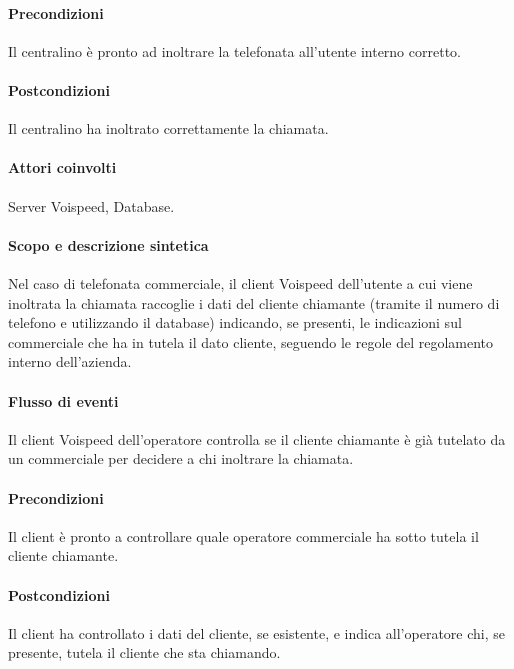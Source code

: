\paragraph{Precondizioni} Il centralino \` e pronto ad inoltrare la telefonata all'utente interno corretto.
\paragraph{Postcondizioni} Il centralino ha inoltrato correttamente la chiamata.

\paragraph{Attori coinvolti} Server Voispeed, Database.
\paragraph{Scopo e descrizione sintetica}
Nel caso di telefonata commerciale, il client Voispeed dell'utente a cui viene inoltrata la chiamata raccoglie i dati del cliente chiamante (tramite il numero di telefono e utilizzando il database) indicando, se presenti, le indicazioni sul commerciale che ha in tutela il dato cliente, seguendo le regole del regolamento interno dell'azienda.
\paragraph{Flusso di eventi}
\begin{elenconumerato}[\textbf{}]{\subsubsecindent}
\item Il client Voispeed dell'operatore controlla se il cliente chiamante \` e gi\` a tutelato da un commerciale per decidere a chi inoltrare la chiamata.
\end{elenconumerato}
\paragraph{Precondizioni} Il client \`e pronto a controllare quale operatore commerciale ha sotto tutela il cliente chiamante.
\paragraph{Postcondizioni} Il client ha controllato i dati del cliente, se esistente, e indica all'operatore chi, se presente, tutela il cliente che sta chiamando.


